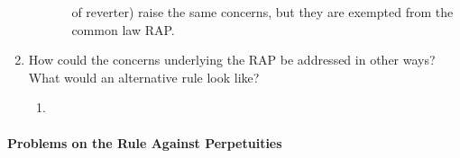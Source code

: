 \begin{enumerate}
\begin{enumerate}
\begin{enumerate}
            of reverter) raise the same concerns, but they are exempted from 
            the common law RAP.
        \end{enumerate}
    \end{enumerate}
    \item How could the concerns underlying the RAP be addressed in other 
    ways? What would an alternative rule look like?
    \begin{enumerate}
        \item %
    \end{enumerate}
\end{enumerate}

\paragraph{Problems on the Rule Against Perpetuities}
